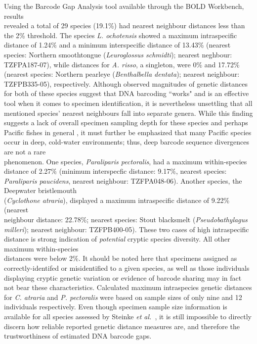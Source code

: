 Using the Barcode Gap Analysis tool available through the BOLD Workbench, results \\ revealed a total of 29 species (19.1\%) had nearest neighbour distances less than the 2\% threshold. The species \textit{L. ochotensis} showed a maximum intraspecific distance of 1.24\% and a minimum interspecific distance of 13.43\% (nearest species: Northern smoothtongue (\textit{Leuroglossus schmidti}); nearest neghbour: TZFPA187-07), while distances for \textit{A. risso}, a singleton, were 0\% and 17.72\% (nearest species: Northern pearleye (\textit{Benthalbella dentata}); nearest neighbour: TZFPB335-05), respectively. Although observed magnitudes of genetic distances for both of these species suggest that DNA barcoding ``works" and is an effective tool when it comes to specimen identification, it is nevertheless unsettling that all \\ mentioned species' nearest neighbours fall into separate genera. While this finding suggests a lack of overall specimen sampling depth for these species and perhaps Pacific fishes in general \cite{steinke2009dna}, it must further be emphasized that many Pacific species occur in deep, cold-water environments; thus, deep barcode sequence divergences are not a rare \\ phenomenon. One species, \textit{Paraliparis pectoralis}, had a maximum within-species distance of 2.27\% (minimum interspecfic distance: 9.17\%, nearest species: \textit{Paraliparis paucidens}, nearest neighbour: TZFPA048-06). Another species, the Deepwater bristlemouth \\ (\textit{Cyclothone atraria}), displayed a maximum intraspecific distance of 9.22\% (nearest \\ neighbour distance: 22.78\%; nearest species: Stout blacksmelt (\textit{Pseudobathylagus milleri}); nearest neighbour: TZFPB400-05). These two cases of high intraspecific distance is strong indication of \textit{potential} cryptic species diversity. All other maximum within-species \\ distances were below 2\%. It should be noted here that specimens assigned as \\ correctly-identifed or misidentified to a given species, as well as those individuals \\ displaying cryptic genetic variation or evidence of barcode sharing may in fact not bear these characteristics. Calculated maximum intraspecies genetic distances for \textit{C. atraria} and \textit{P. pectoralis} were based on sample sizes of only nine and 12 individuals respectively. Even though specimen sample size information is available for all species assessed by Steinke \textit{et al.}~\cite{steinke2009dna}, it is still impossible to directly discern how reliable reported genetic distance measures are, and therefore the trustworthiness of estimated DNA barcode gaps.



